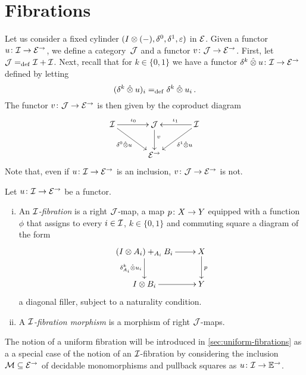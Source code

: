 \documentclass[reqno,10pt,a4paper,oneside]{amsart}
\begin{document}
\section{Fibrations} 
\label{sec:frobenius-uniform-fibration}
 
Let us consider a fixed cylinder $(\interval \otimes (-), \lcyl, \rcyl, \ccyl)$ in $\catE$. 
Given a functor $u \co \cal{I} \to \catE^\to$, we define a category~$\cal{J}$ and a functor $v \co \cal{J} \to \catE^\to$. 
First, let $\cal{J} \defeq \cal{I} + \cal{I}$. Next, recall that for $k \in \{ 0, 1 \}$ we have a functor $\kcyl \hatotimes u 
\co \cal{I} \to \catE^\to$ defined by letting
\[
 (\kcyl \hatotimes u)_i \defeq \kcyl \hatotimes u_i \, .
 \]
The functor $v  \co \cal{J}  \to \catE^\to$ is then given by the coproduct diagram
\begin{equation}
\label{equ:u-interval}
\vcenter{\hbox{\xymatrix@C=1.2cm{
\cal{I} \ar[r]^{\iota_0} \ar[dr]_-{\lcyl \hatotimes u} & \cal{J} \ar[d]^(.4){v} & \cal{I} \ar[dl]^-{\rcyl \hatotimes u} \ar[l]_{\iota_1} \\ 
 & \catE^\to }}}
\end{equation}
Note that, even if $u \co \cal{I} \to \catE^\to$ is an inclusion, $v \co \cal{J} \to \catE^\to$ is not.

\begin{definition} \label{def:I-fibration}
Let $u \co \cal{I} \to \catE^\to$ be a functor.
\begin{enumerate}[(i)]
\item An \emph{$\cal{I}$-fibration} is a right $\cal{J}$-map, \ie 
a map  $p \co X \to Y$ equipped with a function~$\phi$ that assigns
to every $i \in \cal{I}$, $k \in \{0, 1\}$  and commuting
square a diagram of the form
\[
\xymatrix{
(\interval \otimes A_i) +_{A_i} B_i  \ar[r] \ar[d]_{\kcyl_{A_i} \hatotimes u_i} & X \ar[d]^p \\
\interval \otimes B_i  \ar[r] & Y }
\]
a diagonal filler, subject to a naturality condition.
\item A \emph{$\cal{I}$-fibration morphism} is a morphism of right $\cal{J}$-maps.
\end{enumerate}
\end{definition}


\begin{example} The notion of a uniform fibration will be introduced in \cref{sec:uniform-fibrations} as a a 
special case of the notion of an $\cal{I}$-fibration by considering the inclusion 
$\cal{M} \subseteq \cal{E}^\to$ of decidable monomorphisms and pullback squares
as $u \co \cal{I} \to \cat{E}^\to$. 
\end{example} 
\end{document}
